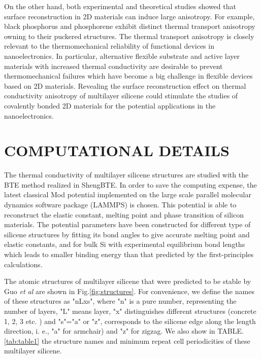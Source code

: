 \documentclass[review]{elsarticle}
\begin{document}
On the other hand, both experimental and theoretical studies showed that surface reconstruction in 2D materials can induce large anisotropy. For example, black phosphorus and phosphorene exhibit distinct thermal transport anisotropy owning to their puckered structures\cite{Zhang2015,Peng2015}.
The thermal transport anisotropy is closely relevant to the thermomechanical reliability of functional devices in nanoelectronics. In particular, alternative flexible substrate and active layer materials with increased thermal conductivity are  desirable  to prevent thermomechanical failures which have become a big challenge in flexible devices based on 2D materials\cite{Akinwande2014,Sadeghi2016}. Revealing the surface reconstruction effect on thermal conductivity anisotropy of multilayer silicene could stimulate the studies of covalently bonded 2D materials for the potential applications in the nanoelectronics.



\section{COMPUTATIONAL DETAILS}

The thermal conductivity of multilayer silicene structures are studied with the BTE method realized in ShengBTE\cite{Li2014}. In order to save the computing expense, the latest classical Mod potential\cite{Parks2007} implemented on the large scale parallel  molecular dynamics software package (LAMMPS) is chosen\cite{Kumagai2007Development}. This potential is able to reconstruct the elastic constant, melting point and phase transition of silicon materials. The potential parameters have been constructed for different type of silicene structures by fitting its bond angles to give accurate melting point and elastic constants, and for bulk Si with experimental equilibrium bond lengths which leads to smaller binding energy than that predicted by the first-principles calculations.

The atomic structures of multilayer silicene that were predicted to be stable by Guo \emph{et al}\cite{Guo2015Structural} are shown in Fig.\ref{fig:structures}. For convenience, we define the names of these structures as "nLxs", where "n" is a pure number, representing the number of layers, "L" means layer, "x" distinguishes different structures (concrete 1, 2, 3 etc. ) and "s"="a" or "z", corresponds to the silicene edge along the length direction, i. e.,  "a" for armchair) and "z" for zigzag. We also show in TABLE.\ref{tab:table1} the structure names and  minimum repeat cell periodicities of these multilayer silicene.
\end{document}
